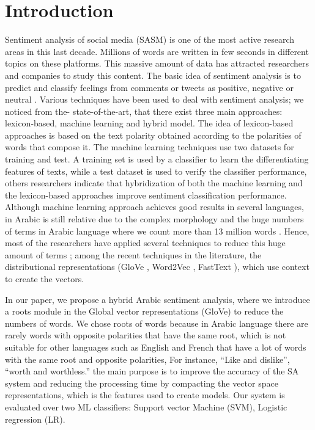 \documentclass[conference]{IEEEtran}
\begin{document}
	\section{Introduction}
	Sentiment analysis of social media (SASM) is one of the most active research areas in this last decade. Millions of words are written in few seconds in different topics on these platforms. This massive amount of data has attracted researchers and companies to study this content. The basic idea of sentiment analysis is to predict and classify feelings from comments or tweets as positive, negative or neutral \cite{7351837}.
	Various techniques have been used to deal with sentiment analysis; we noticed from the- state-of-the-art, that there exist three main approaches: lexicon-based\cite{8673428}, machine learning\cite{8392100} and hybrid model\cite{8250273}. The idea of lexicon-based approaches is based on the text polarity obtained according to the polarities of words that compose it. The machine learning techniques use two datasets for training and test. A training set is used by a classifier to learn the differentiating features of texts, while a test dataset is used to verify the classifier performance, others researchers indicate that hybridization of both the machine learning and the lexicon-based approaches improve sentiment classification performance.
	Although machine learning approach achieves good results in several languages, in Arabic is still relative due to the complex morphology and the huge numbers of terms in Arabic language where we count more than 13 million words \cite{8067771}. Hence, most of the researchers have applied several techniques to reduce this huge amount of terms \cite{8098736} \cite{8500193}; among the recent techniques in the literature, the distributional representations (GloVe \cite{8324059}, Word2Vec \cite{8480191}, FastText \cite{8258460}), which use context to create the vectors.
	
	In our paper, we propose a hybrid Arabic sentiment analysis, where we introduce a roots module in the Global vector representations (GloVe) to reduce the numbers of words. We chose roots of words because in Arabic language there are rarely words with opposite polarities that have the same root, which is not suitable for other languages such as English and French that have a lot of words with the same root and opposite polarities, For instance, “Like and dislike”, “worth and worthless.” the main purpose is to improve the accuracy of the SA system and reducing the processing time  by compacting the vector space representations, which is the features used to create models. Our system is evaluated over two ML classifiers: Support vector Machine (SVM)\cite{6289583}, Logistic regression (LR)\cite{8284501}.  
	
\end{document}
